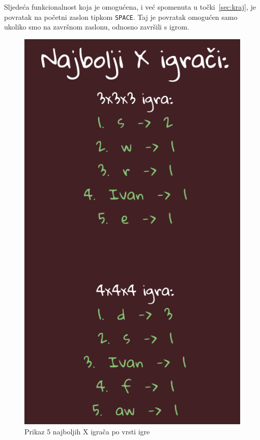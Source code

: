 \documentclass[12pt]{scrartcl}
\begin{document}
Sljedeća funkcionalnost koja je omogućena, i već spomenuta u točki~\ref{sec:kraj}, je povratak na početni zaslon tipkom \texttt{SPACE}. Taj je povratak omogućen samo ukoliko smo na završnom zaslonu, odnosno završili s igrom. \newpage
\begin{figure}[h]
	\centering
	\includegraphics[scale=0.4]{statX.png}
	\caption{Prikaz 5 najboljih X igrača po vrsti igre}
	\label{fig:statX}
\end{figure}
\end{document}
